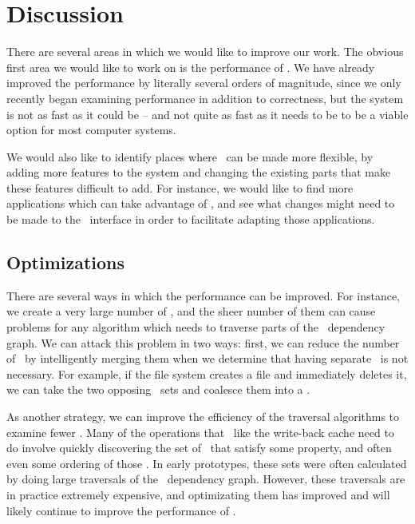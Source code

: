 \section {Discussion}
\label{sec:discussion}

There are several areas in which we would like to improve our work. The obvious
first area we would like to work on is the performance of \Kudos. We have
already improved the performance by literally several orders of magnitude, since
we only recently began examining performance in addition to correctness, but the
system is not as fast as it could be -- and not quite as fast as it needs to be
to be a viable option for most computer systems.

We would also like to identify places where \Kudos\ can be made more flexible,
by adding more features to the system and changing the existing parts that make
these features difficult to add. For instance, we would like to find more
applications which can take advantage of \opgroups, and see what changes might
need to be made to the \opgroup\ interface in order to facilitate adapting those
applications.

\subsection {Optimizations}
There are several ways in which the performance can be improved. For instance,
we create a very large number of \chdescs, and the sheer number of them can
cause problems for any algorithm which needs to traverse parts of the \chdesc\
dependency graph. We can attack this problem in two ways: first, we can reduce
the number of \chdescs\ by intelligently merging them when we determine that
having separate \chdescs\ is not necessary. For example, if the file system
creates a file and immediately deletes it, we can take the two opposing
\chdescs\ sets and coalesce them into a \noop.

As another strategy, we can improve the efficiency of the traversal algorithms
to examine fewer \chdescs. Many of the operations that \modules\ like the
write-back cache need to do involve quickly discovering the set of \chdescs\
that satisfy some property, and often even some ordering of those \chdescs. In
early prototypes, these sets were often calculated by doing large traversals of
the \chdesc\ dependency graph. However, these traversals are in practice
extremely expensive, and optimizating them has improved and will likely continue
to improve the performance of \Kudos.

